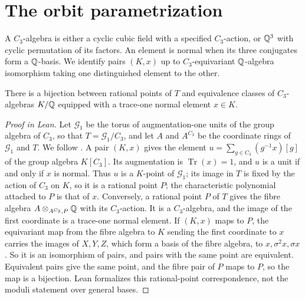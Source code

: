 \chapter{The orbit parametrization}

A $C_3$-algebra is either a cyclic cubic field with a specified $C_3$-action, or $\mathbb{Q}^3$ with cyclic permutation of its factors. An element is normal when its three conjugates form a $\mathbb{Q}$-basis. We identify pairs $(K,x)$ up to $C_3$-equivariant $\mathbb{Q}$-algebra isomorphism taking one distinguished element to the other.

\begin{theorem}

\label{thm:modularInterpretation}


\leanok



There is a bijection between rational points of $T$ and equivalence classes of $C_3$-algebras $K/\mathbb{Q}$ equipped with a trace-one normal element $x\in K$.

\end{theorem}

\begin{proof}[Proof in Lean]

\leanok


Let $\mathcal G_1$ be the torus of augmentation-one units of the group algebra of $C_3$, so that $T=\mathcal G_1/C_3$, and let $A$ and $A^{C_3}$ be the coordinate rings of $\mathcal G_1$ and $T$. We follow \cite[\S2]{odesky2023moduli}. A pair $(K,x)$ gives the element $u=\sum_{g\in C_3}(g^{-1}x)[g]$ of the group algebra $K[C_3]$. Its augmentation is $\operatorname{Tr}(x)=1$, and $u$ is a unit if and only if $x$ is normal. Thus $u$ is a $K$-point of $\mathcal G_1$; its image in $T$ is fixed by the action of $C_3$ on $K$, so it is a rational point $P$; the characteristic polynomial attached to $P$ is that of $x$. Conversely, a rational point $P$ of $T$ gives the fibre algebra $A\otimes_{A^{C_3},P}\mathbb{Q}$ with its $C_3$-action. It is a $C_3$-algebra, and the image of the first coordinate is a trace-one normal element. If $(K,x)$ maps to $P$, the equivariant map from the fibre algebra to $K$ sending the first coordinate to $x$ carries the images of $X,Y,Z$, which form a basis of the fibre algebra, to $x,\sigma^2x,\sigma x$. So it is an isomorphism of pairs, and pairs with the same point are equivalent. Equivalent pairs give the same point, and the fibre pair of $P$ maps to $P$, so the map is a bijection. Lean formalizes this rational-point correspondence, not the moduli statement over general bases.

\end{proof}

